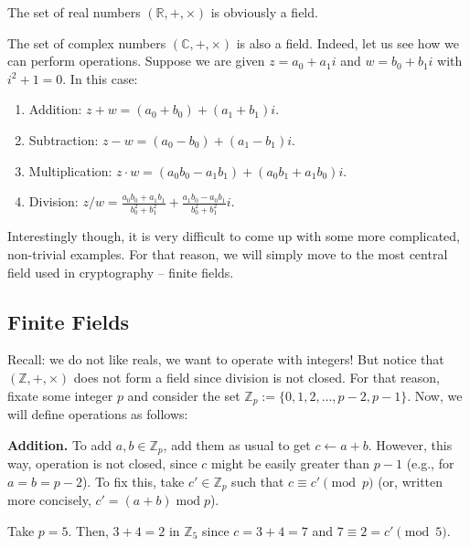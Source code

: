 \documentclass[../lecture-notes.tex]{subfiles}
\begin{document}
\begin{example}
    The set of real numbers $(\mathbb{R}, +, \times)$ is obviously a field.
\end{example}

\begin{example}
    The set of complex numbers $(\mathbb{C}, +, \times)$ is also a field. Indeed, let us see how we can perform operations. Suppose we are given $z = a_0 + a_1i$ and $w = b_0 + b_1i$ with $i^2+1=0$. In this case:
    \begin{enumerate}
        \item Addition: $z + w = (a_0 + b_0) + (a_1 + b_1)i$.
        \item Subtraction: $z - w = (a_0 - b_0) + (a_1 - b_1)i$.
        \item Multiplication: $z \cdot w = (a_0b_0 - a_1b_1) + (a_0b_1 + a_1b_0)i$.
        \item Division: $z / w = \frac{a_0b_0 + a_1b_1}{b_0^2 + b_1^2} + \frac{a_1b_0 - a_0b_1}{b_0^2 + b_1^2}i$.
    \end{enumerate}
\end{example}

Interestingly though, it is very difficult to come up with some more complicated, non-trivial examples. For that reason, we will simply move to the most central field used in cryptography -- finite fields.

\subsection{Finite Fields}
Recall: we do not like reals, we want to operate with integers! But notice that $(\mathbb{Z},+,\times)$ does not form a field since division is not closed. For that reason, fixate some integer $p$ and consider the set $\mathbb{Z}_p := \{0,1,2,\dots,p-2,p-1\}$. Now, we will define operations as follows:

\textbf{Addition.} To add $a,b \in \mathbb{Z}_p$, add them as usual to get $c \gets a+b$. However, this way, operation is not closed, since $c$ might be easily greater than $p-1$ (e.g., for $a=b=p-2$). To fix this, take $c' \in \mathbb{Z}_p$ such that $c \equiv c' \pmod{p}$ (or, written more concisely, $c' = (a+b) \;\text{mod} \; p$). 

\begin{example}
    Take $p=5$. Then, $3+4 = 2$ in $\mathbb{Z}_5$ since $c=3+4=7$ and $7 \equiv 2 = c' \pmod{5}$.
\end{example}
\end{document}
